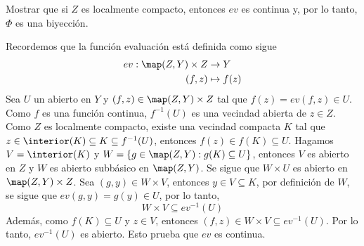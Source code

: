 \begin{ejercicio}
    Mostrar que si $Z$ es localmente compacto, entonces $ev$ es continua y, por lo tanto, $\Phi$ es una biyección.
\end{ejercicio}

\begin{demostracion}
Recordemos que la función evaluación está definida como sigue 
\begin{align*}
        ev:\map(Z,Y)\times Z&\to Y\\
        (f,z)&\mapsto f(z)
    \end{align*}
Sea $U$ un abierto en $Y$ y $(f,z)\in\map(Z,Y)\times Z$ tal que $f(z)=ev(f,z)\in U$. Como $f$ es una función continua, $f^{-1}(U)$ es una vecindad abierta de $z\in Z$. Como $Z$ es localmente compacto, existe una vecindad compacta $K$ tal que $z\in\interior(K)\subseteq K\subseteq f^{-1}(U)$, entonces $f(z)\in f(K)\subseteq U$. Hagamos $V=\interior(K)$ y $W=\{g\in\map(Z,Y):g(K)\subseteq U\}$, entonces $V$ es abierto en $Z$ y $W$ es abierto subbásico en $\map(Z,Y)$. Se sigue que $W\times U$ es abierto en $\map(Z,Y)\times Z$. Sea $(g,y)\in W\times V$, entonces $y\in V\subseteq K$, por definición de $W$, se sigue que $ev(g,y)=g(y)\in U$, por lo tanto,
\[
W\times V\subseteq ev^{-1}(U)
\]
Además, como $f(K)\subseteq U$ y $z\in V$, entonces $(f,z)\in W\times V\subseteq ev^{-1}(U)$. Por lo tanto, $ev^{-1}(U)$ es abierto. Esto prueba que $ev$ es continua.
\end{demostracion}
